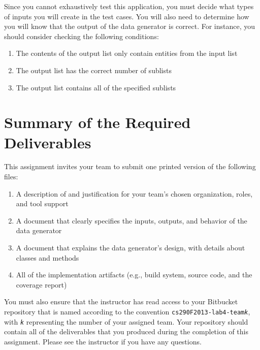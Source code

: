 Since you cannot exhaustively test this application, you must decide what types of inputs you will create in the test
cases.  You will also need to determine how you will know that the output of the data generator is correct.  For
instance, you should consider checking the following conditions:

\begin{enumerate}
	\item The contents of the output list only contain entities from the input list
	\item The output list has the correct number of sublists
	\item The output list contains all of the specified sublists
\end{enumerate}

\section*{Summary of the Required Deliverables}

This assignment invites your team to submit one printed version of the following files:

\begin{enumerate}
	
	\item A description of and justification for your team's chosen organization, roles, and tool support
	\item A document that clearly specifies the inputs, outputs, and behavior of the data generator
	\item A document that explains the data generator's design, with details about classes and methods
	\item All of the implementation artifacts (e.g., build system, source code, and the coverage report) 

\end{enumerate}

You must also ensure that the instructor has read access to your Bitbucket repository that is named according to the
convention {\tt cs290F2013-lab4-team{\em k}}, with {\tt {\em k}} representing the number of your assigned team.  Your
repository should contain all of the deliverables that you produced during the completion of this assignment.  Please
see the instructor if you have any questions.


